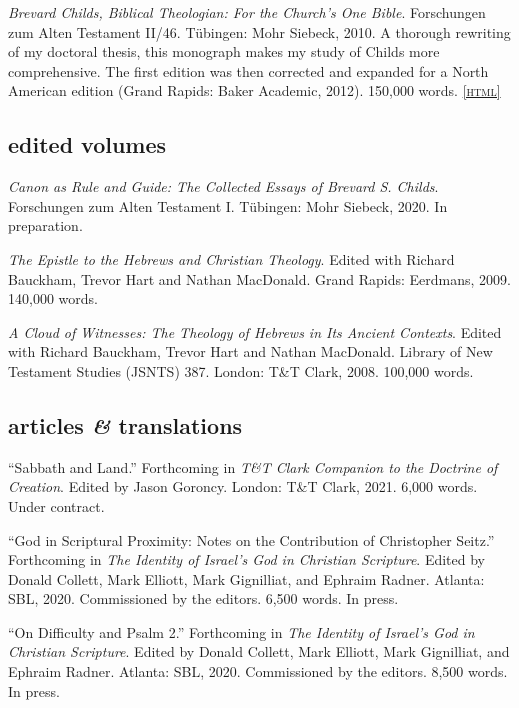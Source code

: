 \documentclass[11pt]{article}
\newcommand{\amper}{\emph{\&}}
\newcommand{\html}[1]{\href{#1}{\footnotesize\textsc{[html]}}}
\newcommand{\years}[1]{\marginnote{\footnotesize #1}}
\begin{document}
\years{2010, 2012}
\emph{Brevard Childs, Biblical Theologian: For the Church’s One Bible}.
Forschungen zum Alten Testament II/46. Tübingen: Mohr Siebeck, 2010. A
thorough rewriting of my doctoral thesis, this monograph makes my study
of Childs more comprehensive. The first edition was then corrected and
expanded for a North American edition (Grand Rapids: Baker Academic,
2012). 150,000 words.
\html{http://danieldriver.com/bsc/}

\subsection*{edited volumes}

\years{2021}
\emph{Canon as Rule and Guide: The Collected Essays of Brevard S. Childs}.
Forschungen zum Alten Testament I. Tübingen: Mohr Siebeck, 2020. In preparation.

\years{2009}
\emph{The Epistle to the Hebrews and Christian Theology}. Edited with
Richard Bauckham, Trevor Hart and Nathan MacDonald. Grand Rapids:
Eerdmans, 2009. 140,000 words.

\years{2008}
\emph{A Cloud of Witnesses: The Theology of Hebrews in Its Ancient
Contexts}. Edited with Richard Bauckham, Trevor Hart and Nathan
MacDonald. Library of New Testament Studies (JSNTS) 387. London: T\&T
Clark, 2008. 100,000 words.

\subsection*{articles \amper{} translations}

\years{2021}
``Sabbath and Land.'' Forthcoming in \emph{T\&T Clark Companion to the
Doctrine of Creation}. Edited by Jason Goroncy. London: T\&T Clark,
2021. 6,000 words. Under contract.

\years{2020}
``God in Scriptural Proximity: Notes on the Contribution of Christopher
Seitz.'' Forthcoming in \emph{The Identity of Israel’s God in Christian
Scripture}. Edited by Donald Collett, Mark Elliott, Mark Gignilliat, and
Ephraim Radner. Atlanta: SBL, 2020. Commissioned by the editors. 6,500
words. In press.

\years{2020}
``On Difficulty and Psalm 2.'' Forthcoming in \emph{The Identity of
Israel’s God in Christian Scripture}. Edited by Donald Collett, Mark
Elliott, Mark Gignilliat, and Ephraim Radner. Atlanta: SBL, 2020.
Commissioned by the editors. 8,500 words. In press.
\end{document}
